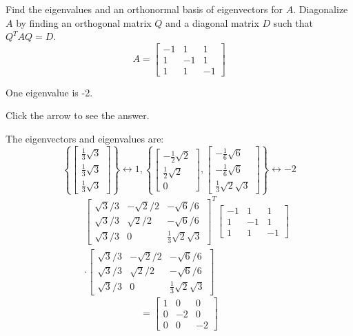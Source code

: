 \documentclass{ximera}
\begin{document}
 \begin{problem}\label{prb:9.3} Find the eigenvalues and an orthonormal basis of eigenvectors for $A.$
Diagonalize $A$ by finding an orthogonal matrix $Q$ and a diagonal matrix $D$
such that $Q^{T}AQ=D$.
\begin{equation*}
A=\left[
\begin{array}{rrr}
-1 & 1 & 1 \\
1 & -1 & 1 \\
1 & 1 & -1
\end{array}
\right]
\end{equation*}

\begin{hint} 
One eigenvalue is -2.

Click the arrow to see the answer. \begin{expandable}
The eigenvectors and eigenvalues are:
\[
\left\{ \left[
\begin{array}{c}
\frac{1}{3}\sqrt{3} \\
\frac{1}{3}\sqrt{3} \\
\frac{1}{3}\sqrt{3}
\end{array}
\right] \right\} \leftrightarrow 1,\left\{ \left[
\begin{array}{c}
-\frac{1}{2}\sqrt{2} \\
\frac{1}{2}\sqrt{2} \\
0
\end{array}
\right] ,  \left[
\begin{array}{c}
-\frac{1}{6}\sqrt{6} \\
-\frac{1}{6}\sqrt{6} \\
\frac{1}{3}\sqrt{2}\sqrt{3}
\end{array}
\right] \right\} \leftrightarrow -2
\]
\begin{eqnarray*}
&&\left[
\begin{array}{ccc}
\sqrt{3}/3 & -\sqrt{2}/2 & -\sqrt{6}/6 \\
\sqrt{3}/3 & \sqrt{2}/2 & -\sqrt{6}/6 \\
\sqrt{3}/3 & 0 & \frac{1}{3}\sqrt{2}\sqrt{3}
\end{array}
\right]^{T}\left[
\begin{array}{rrr}
-1 & 1 & 1 \\
1 & -1 & 1 \\
1 & 1 & -1
\end{array}
\right]  \\
&&\cdot \left[
\begin{array}{ccc}
\sqrt{3}/3 & -\sqrt{2}/2 & -\sqrt{6}/6 \\
\sqrt{3}/3 & \sqrt{2}/2 & -\sqrt{6}/6 \\
\sqrt{3}/3 & 0 & \frac{1}{3}\sqrt{2}\sqrt{3}
\end{array}
\right]
\end{eqnarray*}
\[
=\left[
\begin{array}{rrr}
1 & 0 & 0 \\
0 & -2 & 0 \\
0 & 0 & -2
\end{array}
\right]
\]
\end{expandable} \end{hint}
\end{problem}
\end{document}
